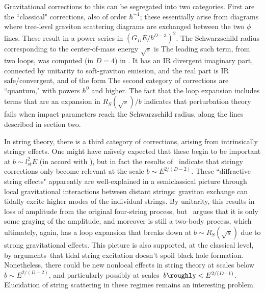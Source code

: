 Gravitational corrections to this can be segregated into two categories.  First are the ``classical" corrections, also of order $\hbar^{-1}$; these essentially arise from diagrams where tree-level graviton scattering diagrams are exchanged between the two $\phi$ lines.  These result in a power series  in $(G_DE/b^{D-3})^2$.  The Schwarzschild radius corresponding to the center-of-mass energy $\sqrt s$ is 
%
\eqn{}
%
The leading such term, from two loops, was computed (in $D=4$) in \ACVfour.  It has an IR divergent imaginary part, connected by unitarity to soft-graviton emission, and the real part is IR safe/convergent, and of the form
%
\eqn{}
%
The second category of corrections are ``quantum," with powers $\hbar^0$ and higher.  The fact that the loop expansion includes terms that are an expansion in $R_S(\sqrt s)/b$ indicates that perturbation theory fails when impact parameters reach the Schwarzschild radius, along the lines described in section two.


In string theory, there is a third category of corrections, arising from intrinsically stringy effects.  One might have na\"\i vely expected that these begin to be important at $b\sim l_{st}^2 E$ (in accord with \genunc), but in fact the results of~ indicate that stringy corrections only become relevant at the scale $b\sim E^{2/(D-2)}$.  These ``diffractive string effects" 
apparently are well-explained in a semiclassical picture through
 local gravitational interactions between distant strings\LQGST:  graviton exchange can tidally excite higher modes of the individual strings.  By unitarity, this results in loss of amplitude from the original four-string process, but \ACVtwo\ argues that it is only some graying of the amplitude, and moreover is still a two-body process, which ultimately, again, has a loop expansion that breaks down at $b\sim R_S(\sqrt s)$ due to strong gravitational effects.  This picture is also supported, at the classical level, by arguments\LQGST\ that tidal string excitation doesn't spoil black hole formation.  Nonetheless, there could be new nonlocal effects in string theory at scales below $b\sim E^{2/(D-2)}$, and particularly possibly at scales\LQGST\ $b\roughly< E^{2/(D-1)}$.  Elucidation of string scattering in these regimes remains an interesting problem.

